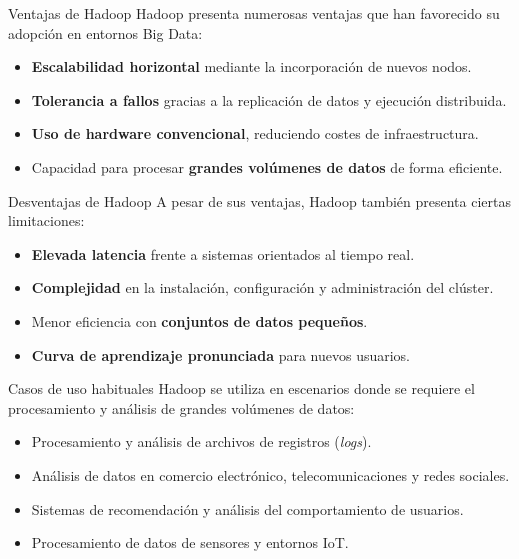 \documentclass{beamer}
\begin{document}
\begin{frame}{Ventajas de Hadoop}
Hadoop presenta numerosas ventajas que han favorecido su adopción en entornos Big Data:
\begin{itemize}
    \item \textbf{Escalabilidad horizontal} mediante la incorporación de nuevos nodos.
    \item \textbf{Tolerancia a fallos} gracias a la replicación de datos y ejecución distribuida.
    \item \textbf{Uso de hardware convencional}, reduciendo costes de infraestructura.
    \item Capacidad para procesar \textbf{grandes volúmenes de datos} de forma eficiente.
\end{itemize}
\end{frame}

\begin{frame}{Desventajas de Hadoop}
A pesar de sus ventajas, Hadoop también presenta ciertas limitaciones:
\begin{itemize}
    \item \textbf{Elevada latencia} frente a sistemas orientados al tiempo real.
    \item \textbf{Complejidad} en la instalación, configuración y administración del clúster.
    \item Menor eficiencia con \textbf{conjuntos de datos pequeños}.
    \item \textbf{Curva de aprendizaje pronunciada} para nuevos usuarios.
\end{itemize}
\end{frame}

\begin{frame}{Casos de uso habituales}
Hadoop se utiliza en escenarios donde se requiere el procesamiento y análisis de grandes volúmenes de datos:
\begin{itemize}
    \item Procesamiento y análisis de archivos de registros (\textit{logs}).
    \item Análisis de datos en comercio electrónico, telecomunicaciones y redes sociales.
    \item Sistemas de recomendación y análisis del comportamiento de usuarios.
    \item Procesamiento de datos de sensores y entornos IoT.
\end{itemize}
\end{frame}
\end{document}
